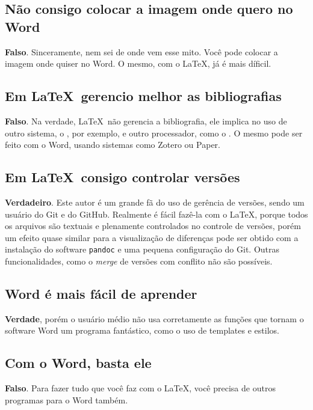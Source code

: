\subsection{Não consigo colocar a imagem onde quero no Word}

\textbf{Falso}. Sinceramente, nem sei de onde vem esse mito. Você pode colocar a imagem onde quiser no Word. O mesmo, com o \LaTeX, já é mais díficil.

\subsection{Em \LaTeX\ gerencio melhor as bibliografias}

\textbf{Falso}.  Na verdade, \LaTeX\  não gerencia a bibliografia, ele implica no uso de outro sistema, o , por exemplo, e outro processador, como o . O mesmo pode ser feito com o Word, usando sistemas como Zotero ou Paper.

\subsection{Em \LaTeX\  consigo controlar versões}

\textbf{Verdadeiro}. Este autor é um grande fã do uso de gerência de versões, sendo um usuário do Git e do GitHub. Realmente é fácil fazê-la com o \LaTeX , porque todos os arquivos são textuais e plenamente controlados no controle de versões, porém um efeito quase similar para a visualização de diferenças pode ser obtido com a instalação do software \texttt{pandoc} e uma pequena configuração do Git. Outras funcionalidades, como o \textit{merge} de versões com conflito não são possíveis.

\subsection{Word é mais fácil de aprender}

\textbf{Verdade}, porém o usuário médio não usa corretamente as funções que tornam o software Word um programa fantástico, como o uso de templates e estilos.

\subsection{Com o Word, basta ele}

\textbf{Falso}. Para fazer tudo que você faz com o \LaTeX , você precisa de outros programas para o Word também.

